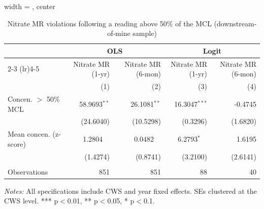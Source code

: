 
\begin{table}[htbp]
\caption{Nitrate MR violations following a reading above 50\% of the MCL (downstream-of-mine sample)}\label{tab:mr_concentration_lag_logit}
\centering
\begin{adjustbox}{width = \textwidth, center}
   \begin{tabular}{lrrrr}
      \toprule    
       & \multicolumn{2}{c}{OLS} & \multicolumn{2}{c}{Logit} \\ \cmidrule(lr){2-3} \cmidrule(lr){4-5}
                      & Nitrate MR (1-yr) & Nitrate MR (6-mon)  & Nitrate MR (1-yr) & Nitrate MR (6-mon) \\   
                      & (1)               & (2)                 & (3)               & (4)\\  
      \midrule 
      Concen. $>$ 50\% MCL       & 58.9693$^{**}$    & 26.1081$^{**}$      & 16.3047$^{***}$   & -0.4745\\   
                      & (24.6040)         & (10.5298)           & (0.3296)          & (1.6820)\\   
      Mean concen. (z-score)   & 1.2804$^{\phantom{**}}$            & 0.0482$^{\phantom{**}}$              & 6.2793$^{*\phantom{**}}$      & 1.6195\\   
                      & (1.4274)          & (0.8741)            & (3.2100)          & (2.6141)\\   
       \\
      Observations    & 851               & 851                 & 88                & 40\\  
      \bottomrule
   \end{tabular}
\end{adjustbox}
{\tiny\linespread{1}\selectfont \par \raggedright \textit{Notes:} All specifications include CWS and year fixed effects. SEs clustered at the CWS level. *** p$<$0.01, ** p$<$0.05, * p$<$0.1.}
\end{table}
